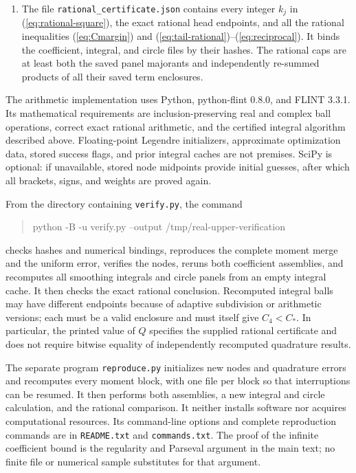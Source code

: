\begin{enumerate}
Equations (\ref{eq:S-integral})--(\ref{eq:S-tail}) justify the integral
values and their complete errors; equations
(\ref{eq:density-mass})--(\ref{eq:panel-majorant}) justify every other
finite term. The filename and the auxiliary degree-251 tail field of
the norm engine do not limit its derivative bound: its integral and
circle calculations depend only on $L$, $P$, and derivative order four.
The degree-501 tail is calculated separately from (\ref{eq:tail-final}).
\item The file \nolinkurl{rational_certificate.json} contains every
integer $k_j$ in (\ref{eq:rational-square}), the exact rational head
endpoints, and all the rational inequalities
(\ref{eq:Cmargin}) and (\ref{eq:tail-rational})--(\ref{eq:reciprocal}).
It binds the coefficient, integral, and circle files by their hashes.
The rational caps are at least both the saved panel majorants and
independently re-summed products of all their saved term enclosures.
\end{enumerate}

The arithmetic implementation uses Python, python-flint 0.8.0, and
FLINT 3.3.1. Its mathematical requirements are inclusion-preserving
real and complex ball operations, correct exact rational arithmetic,
and the certified integral algorithm described above. Floating-point
Legendre initializers, approximate optimization data, stored success
flags, and prior integral caches are not premises. SciPy is optional:
if unavailable, stored node midpoints provide initial guesses, after
which all brackets, signs, and weights are proved again.

From the directory containing \nolinkurl{verify.py}, the command
\begin{quote}\small\ttfamily
python -B -u verify.py --output /tmp/real-upper-verification
\end{quote}
checks hashes and numerical bindings, reproduces the complete moment
merge and the uniform error, verifies the nodes, reruns both coefficient
assemblies, and recomputes all smoothing integrals and circle panels
from an empty integral cache. It then checks the exact rational
conclusion. Recomputed integral balls may have different endpoints
because of adaptive subdivision or arithmetic versions; each must be a
valid enclosure and must itself give $C_4<C_*$. In particular, the
printed value of $Q$ specifies the supplied rational certificate and
does not require bitwise equality of independently recomputed
quadrature results.

The separate program \nolinkurl{reproduce.py} initializes new nodes and
quadrature errors and recomputes every moment block, with one file per
block so that interruptions can be resumed. It then performs both
assemblies, a new integral and circle calculation, and the rational
comparison. It neither installs software nor acquires computational
resources. Its command-line options and complete reproduction commands
are in \nolinkurl{README.txt} and \nolinkurl{commands.txt}. The proof of the
infinite coefficient bound is the regularity and Parseval argument in
the main text; no finite file or numerical sample substitutes for that
argument.
